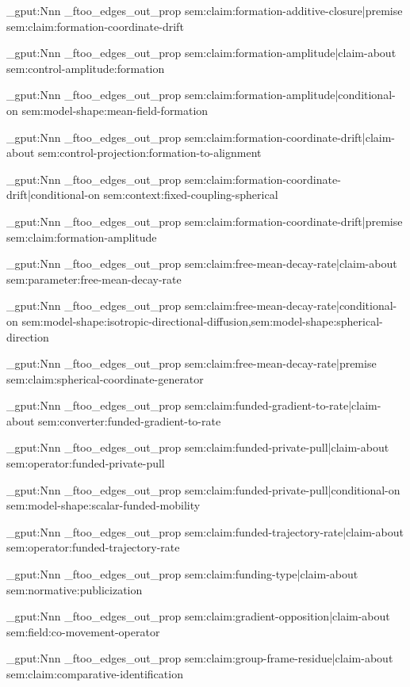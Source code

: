 \prop_gput:Nnn \g_ftoo_edges_out_prop { sem:claim:formation-additive-closure|premise } { sem:claim:formation-coordinate-drift }

\prop_gput:Nnn \g_ftoo_edges_out_prop { sem:claim:formation-amplitude|claim-about } { sem:control-amplitude:formation }

\prop_gput:Nnn \g_ftoo_edges_out_prop { sem:claim:formation-amplitude|conditional-on } { sem:model-shape:mean-field-formation }

\prop_gput:Nnn \g_ftoo_edges_out_prop { sem:claim:formation-coordinate-drift|claim-about } { sem:control-projection:formation-to-alignment }

\prop_gput:Nnn \g_ftoo_edges_out_prop { sem:claim:formation-coordinate-drift|conditional-on } { sem:context:fixed-coupling-spherical }

\prop_gput:Nnn \g_ftoo_edges_out_prop { sem:claim:formation-coordinate-drift|premise } { sem:claim:formation-amplitude }

\prop_gput:Nnn \g_ftoo_edges_out_prop { sem:claim:free-mean-decay-rate|claim-about } { sem:parameter:free-mean-decay-rate }

\prop_gput:Nnn \g_ftoo_edges_out_prop { sem:claim:free-mean-decay-rate|conditional-on } { sem:model-shape:isotropic-directional-diffusion,sem:model-shape:spherical-direction }

\prop_gput:Nnn \g_ftoo_edges_out_prop { sem:claim:free-mean-decay-rate|premise } { sem:claim:spherical-coordinate-generator }

\prop_gput:Nnn \g_ftoo_edges_out_prop { sem:claim:funded-gradient-to-rate|claim-about } { sem:converter:funded-gradient-to-rate }

\prop_gput:Nnn \g_ftoo_edges_out_prop { sem:claim:funded-private-pull|claim-about } { sem:operator:funded-private-pull }

\prop_gput:Nnn \g_ftoo_edges_out_prop { sem:claim:funded-private-pull|conditional-on } { sem:model-shape:scalar-funded-mobility }

\prop_gput:Nnn \g_ftoo_edges_out_prop { sem:claim:funded-trajectory-rate|claim-about } { sem:operator:funded-trajectory-rate }

\prop_gput:Nnn \g_ftoo_edges_out_prop { sem:claim:funding-type|claim-about } { sem:normative:publicization }

\prop_gput:Nnn \g_ftoo_edges_out_prop { sem:claim:gradient-opposition|claim-about } { sem:field:co-movement-operator }

\prop_gput:Nnn \g_ftoo_edges_out_prop { sem:claim:group-frame-residue|claim-about } { sem:claim:comparative-identification }

